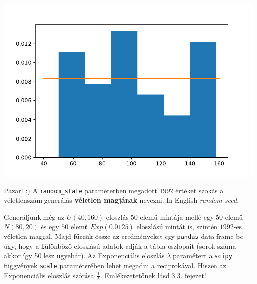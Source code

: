 \documentclass[
]{book}
\begin{document}
\includegraphics{_main_files/figure-latex/unnamed-chunk-210-13.pdf}

Pazar! :) A \texttt{random\_state} paraméterben megadott \(1992\) értéket szokás a véletlenszám generálás \textbf{véletlen magjának} nevezni. In English \emph{random seed}.

Generáljunk még az \(U(40, 160)\) eloszlás \(50\) elemű mintája mellé egy \(50\) elemű \(N(80,20)\) és egy \(50\) elemű \(Exp(0.0125)\) eloszlású mintát is, szintén \(1992\)-es véletlen maggal. Majd fűzzük össze az eredményeket egy \texttt{pandas} data frame-be úgy, hogy a különböző eloszlású adatok adják a tábla oszlopait (sorok száma akkor így 50 lesz ugyebár).
Az Exponenciális eloszlás \(\lambda\) paramétert a \texttt{scipy} függvények \texttt{scale} paraméterében lehet megadni a reciprokával. Hiszen az Exponenciális eloszlás szórása \(\frac{1}{\lambda}\). Emlékezetetőnek lásd 3.3. fejezet!
\end{document}
